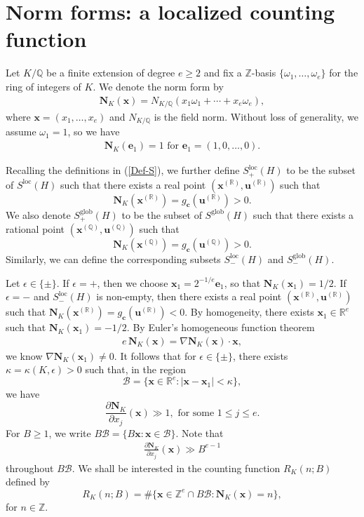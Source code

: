 \documentclass[reqno, 11pt]{amsart}
\renewcommand{\leq}{\leqslant}
\renewcommand{\geq}{\geqslant}
\theoremstyle{definition}
\theoremstyle{definition}
\renewcommand{\geq}{\geqslant}
\renewcommand{\leq}{\leqslant}
\newcommand{\RR}{\mathbb{R}}
\newcommand{\BB}{\mathcal{B}}
\newcommand{\cc}{\mathbf{c}}
\newcommand{\ee}{\mathbf{e}}
\newcommand{\uu}{\mathbf{u}}
\newcommand{\xx}{\mathbf{x}}
\newcommand{\pa}{\partial}
\newcommand{\QQ}{\mathbb{Q}}
\newcommand{\ZZ}{\mathbb{Z}}
\newcommand{\NNN}{\mathbf{N}}
\numberwithin{equation}{section}
\begin{document}
\section{Norm forms: a localized counting function}

Let $K/\QQ$ be a finite extension of degree $e \geq 2$ and fix a $\ZZ$-basis $\{\omega_1, \dots, \omega_e\}$ for the ring of integers of $K$. We denote the norm form by
\begin{align*}
	\mathbf{N}_K(\mathbf{x}) = N_{K/\QQ}(x_1 \omega_1 + \cdots + x_e \omega_e),
\end{align*}
where $\mathbf{x} = (x_1, \dots, x_e)$ and $N_{K/\QQ}$ is the field norm. Without loss of generality, we assume $\omega_1 = 1$, so we have 
\begin{align}\label{e-1}
	\NNN_K(\ee_1) = 1 \text{ for } \ee_1 = (1, 0, \dots, 0).
\end{align}



Recalling the definitions in (\ref{Def-S}), we further define $S^{\mathrm{loc}}_+(H)$ to be the subset of $S^{\mathrm{loc}}(H)$ such that there exists a real point $(\xx^{(\RR)}, \uu^{(\RR)} )$ such that
$$\NNN_K(\xx^{(\RR)}) = g_\cc(\uu^{(\RR)}) > 0.$$
We also denote $S^{\mathrm{glob}}_+(H)$ to be the subset of $S^{\mathrm{glob}}(H)$ such that there exists a rational point 
$(\xx^{(\QQ)}, \uu^{(\QQ)} )$ such that
$$\NNN_K(\xx^{(\QQ)}) = g_\cc(\uu^{(\QQ)}) > 0.$$
Similarly, we can define the corresponding subsets $S^{\mathrm{loc}}_-(H)$ and $S^{\mathrm{glob}}_-(H)$.



Let $\epsilon \in \{\pm\}$. If $\epsilon = +$, then we choose $\xx_1 = 2^{-1/e} \ee_1$, so that $\NNN_K(\xx_1) = 1/2$. If $\epsilon = -$ and $S^{\mathrm{loc}}_-(H)$ is non-empty, then there exists a real point $(\xx^{(\RR)}, \uu^{(\RR)} )$ such that
$\NNN_K(\xx^{(\RR)}) = g_\cc(\uu^{(\RR)}) < 0$. By homogeneity, there exists $\xx_1 \in \RR^{e}$ such that $\NNN_K(\xx_1) = -1/2$.
By Euler's homogeneous function theorem
\begin{align}\label{euler}
	e \, \NNN_K(\xx) = \nabla \NNN_K(\xx) \cdot \xx,
\end{align}
we know $\nabla\NNN_K(\xx_1) \neq 0$.
It follows that for $\epsilon \in \{\pm\}$, there exists $\kappa = \kappa(K, \epsilon) > 0$ such that, in the region 
\begin{equation}\label{def-reg-B}
	\mathcal{B} = \{ \mathbf{x} \in \RR^e: |\xx - \xx_1| < \kappa \},
\end{equation}
we have 
$$\frac{\pa \NNN_K}{\pa x_j}(\xx) \gg 1, \text{ for some } 1 \leq j \leq e.$$
For $B \geq 1$, we write $B \BB = \{B\xx : \xx \in \BB\}$.
Note that 
\begin{align}\label{bound-pa}
	\frac{\pa \NNN_K}{\pa x_j}(\xx) \gg B^{e-1}
\end{align}
throughout $B\BB$.
We shall be interested in the counting function $R_K(n; B)$ defined by
\begin{equation}\label{def-R}
R_K(n; B) = \# \{ \mathbf{x} \in \ZZ^e \cap B \mathcal{B}: \mathbf{N}_K(\mathbf{x}) = n \},
\end{equation}
for $n \in \ZZ$.
\end{document}
